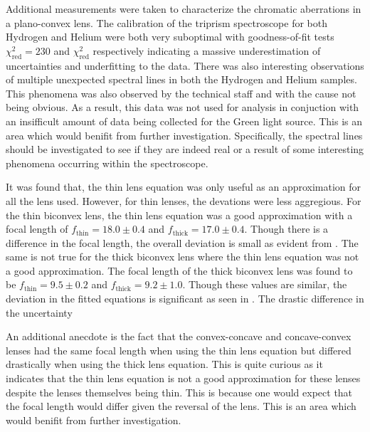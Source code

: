 \documentclass[aip, cp, amsmath, amssymb, reprint, nofootinbib]{revtex4-2}
\begin{document}
        Additional measurements were taken to characterize the chromatic aberrations in a plano-convex lens. The calibration of the triprism spectroscope for both Hydrogen and Helium were both very suboptimal with goodness-of-fit tests $\chi^2_\text{red}=230$ and $\chi^2_\text{red}$ respectively indicating a massive underestimation of uncertainties and underfitting to the data. There was also interesting observations of multiple unexpected spectral lines in both the Hydrogen and Helium samples. This phenomena was also observed by the technical staff and with the cause not being obvious. As a result, this data was not used for analysis in conjuction with an insifficult amount of data being collected for the Green light source. This is an area which would benifit from further investigation. Specifically, the spectral lines should be investigated to see if they are indeed real or a result of some interesting phenomena occurring within the spectroscope.

        It was found that, the thin lens equation was only useful as an approximation for all the lens used. However, for thin lenses, the devations were less aggregious. For the thin biconvex lens, the thin lens equation was a good approximation with a focal length of $f_\text{thin} = 18.0\pm0.4$ and $f_\text{thick} = 17.0\pm0.4$. Though there is a difference in the focal length, the overall deviation is small as evident from . The same is not true for the thick biconvex lens where the thin lens equation was not a good approximation. The focal length of the thick biconvex lens was found to be $f_\text{thin} = 9.5\pm0.2$ and $f_\text{thick} = 9.2\pm1.0$. Though these values are similar, the deviation in the fitted equations is significant as seen in . The drastic difference in the uncertainty 
        
        An additional anecdote is the fact that the convex-concave and concave-convex lenses had the same focal length when using the thin lens equation but differed drastically when using the thick lens equation. This is quite curious as it indicates that the thin lens equation is not a good approximation for these lenses despite the lenses themselves being thin. This is because one would expect that the focal length would differ given the reversal of the lens. This is an area which would benifit from further investigation. 
\end{document}
